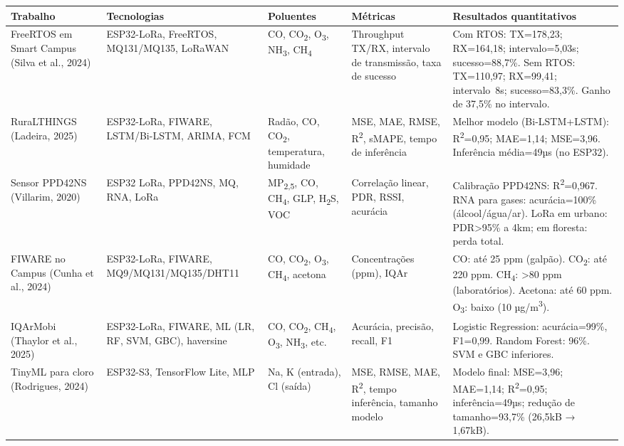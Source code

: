 \begin{table}[H]
\centering
\small
\setlength{\tabcolsep}{6pt}
\begin{tabularx}{\textwidth}{|p{2.2cm}|p{2.2cm}|p{1.8cm}|p{2.5cm}|X|}
\hline
\textbf{Trabalho} & \textbf{Tecnologias} & \textbf{Poluentes} & \textbf{Métricas} & \textbf{Resultados quantitativos} \\
\hline
FreeRTOS em Smart Campus (Silva et al., 2024) & ESP32-LoRa, FreeRTOS, MQ131/MQ135, LoRaWAN & CO, CO\textsubscript{2}, O\textsubscript{3}, NH\textsubscript{3}, CH\textsubscript{4} & Throughput TX/RX, intervalo de transmissão, taxa de sucesso & Com RTOS: TX=178,23; RX=164,18; intervalo=5,03s; sucesso=88,7\%. Sem RTOS: TX=110,97; RX=99,41; intervalo~8s; sucesso=83,3\%. Ganho de 37,5\% no intervalo. \\
\hline
RuraLTHINGS (Ladeira, 2025) & ESP32-LoRa, FIWARE, LSTM/Bi-LSTM, ARIMA, FCM & Radão, CO, CO\textsubscript{2}, temperatura, humidade & MSE, MAE, RMSE, R\textsuperscript{2}, sMAPE, tempo de inferência & Melhor modelo (Bi-LSTM+LSTM): R\textsuperscript{2}=0,95; MAE=1,14; MSE=3,96. Inferência média=49µs (no ESP32). \\
\hline
Sensor PPD42NS (Villarim, 2020) & ESP32 LoRa, PPD42NS, MQ, RNA, LoRa & MP\textsubscript{2,5}, CO, CH\textsubscript{4}, GLP, H\textsubscript{2}S, VOC & Correlação linear, PDR, RSSI, acurácia & Calibração PPD42NS: R\textsuperscript{2}=0,967. RNA para gases: acurácia=100\% (álcool/água/ar). LoRa em urbano: PDR>95\% a 4km; em floresta: perda total. \\
\hline
FIWARE no Campus (Cunha et al., 2024) & ESP32-LoRa, FIWARE, MQ9/MQ131/MQ135/DHT11 & CO, CO\textsubscript{2}, O\textsubscript{3}, CH\textsubscript{4}, acetona & Concentrações (ppm), IQAr & CO: até 25 ppm (galpão). CO\textsubscript{2}: até 220 ppm. CH\textsubscript{4}: >80 ppm (laboratórios). Acetona: até 60 ppm. O\textsubscript{3}: baixo (10 µg/m\textsuperscript{3}). \\
\hline
IQArMobi (Thaylor et al., 2025) & ESP32-LoRa, FIWARE, ML (LR, RF, SVM, GBC), haversine & CO, CO\textsubscript{2}, CH\textsubscript{4}, O\textsubscript{3}, NH\textsubscript{3}, etc. & Acurácia, precisão, recall, F1 & Logistic Regression: acurácia=99\%, F1=0,99. Random Forest: 96\%. SVM e GBC inferiores. \\
\hline
TinyML para cloro (Rodrigues, 2024) & ESP32-S3, TensorFlow Lite, MLP & Na, K (entrada), Cl (saída) & MSE, RMSE, MAE, R\textsuperscript{2}, tempo inferência, tamanho modelo & Modelo final: MSE=3,96; MAE=1,14; R\textsuperscript{2}=0,95; inferência=49µs; redução de tamanho=93,7\% (26,5kB → 1,67kB). \\
\hline
\end{tabularx}
\end{table}

